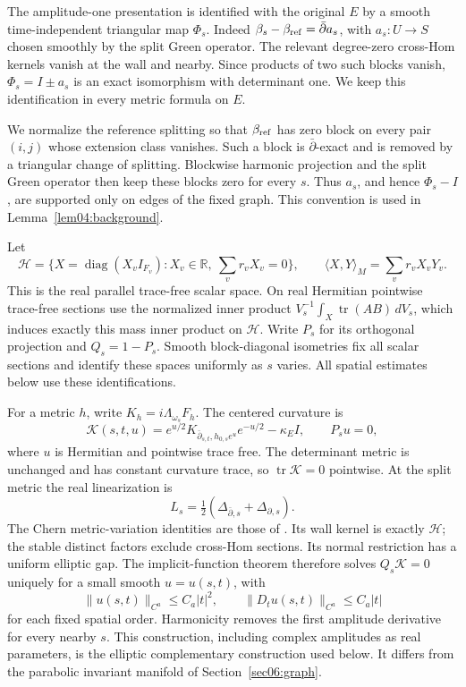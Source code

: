 \documentclass[11pt]{amsart}
\theoremstyle{definition}
\theoremstyle{remark}
\newcommand{\RR}{\mathbb R}
\newcommand{\HH}{\mathcal H}
\newcommand{\cK}{\mathcal K}
\newcommand{\db}{\bar\partial}
\newcommand{\tr}{\operatorname{tr}}
\newcommand{\diag}{\operatorname{diag}}
\begin{document}
The amplitude-one presentation is identified with the original
\(E\) by a smooth time-independent triangular map \(\Phi_s\).
Indeed \(\beta_s-\beta_{\rm ref}=\db a_s\), with \(a_s:U\to S\)
chosen smoothly by the split Green operator. The relevant degree-zero
cross-Hom kernels vanish at the wall and nearby. Since products of
two such blocks vanish, \(\Phi_s=I\pm a_s\) is an exact isomorphism
with determinant one. We keep this identification in every metric
formula on \(E\).

We normalize the reference splitting so that \(\beta_{\rm ref}\)
has zero block on every pair \((i,j)\) whose extension class vanishes.
Such a block is \(\db\)-exact and is removed by a triangular
change of splitting. Blockwise harmonic projection and the split
Green operator then keep these blocks zero for every \(s\).
Thus \(a_s\), and hence \(\Phi_s-I\), are supported only on
edges of the fixed graph. This convention is used in
Lemma~\ref{lem04:background}.

Let
\begin{equation}\label{eq02:scalarspace}
 \HH=\{X=\diag(X_vI_{F_v}):X_v\in\RR,\ \sum_vr_vX_v=0\},
 \qquad \langle X,Y\rangle_M=\sum_vr_vX_vY_v.
\end{equation}
This is the real parallel trace-free scalar space. On real Hermitian
pointwise trace-free sections use the normalized inner product
\(V_s^{-1}\int_X\tr(AB)\,dV_s\), which induces exactly this mass
inner product on \(\HH\). Write \(P_s\) for its orthogonal
projection and \(Q_s=1-P_s\). Smooth block-diagonal isometries fix
all scalar sections and identify these spaces uniformly as \(s\)
varies. All spatial estimates below use these identifications.

For a metric \(h\), write \(K_h=i\Lambda_{\omega_s}F_h\).
The centered curvature is
\[
 \cK(s,t,u)=e^{u/2}K_{\db_{s,t},h_{0,s}e^u}e^{-u/2}-\kappa_EI,
 \qquad P_su=0,
\]
where \(u\) is Hermitian and pointwise trace free. The determinant
metric is unchanged and has constant curvature trace, so
\(\tr\cK=0\) pointwise. At the split metric the real linearization is
\begin{equation}\label{eq02:realoperator}
 L_s=\tfrac12(\Delta_{\db,s}+\Delta_{\partial,s}).
\end{equation}
The Chern metric-variation identities are those of
\cite[\S4.2, equations~(4.2.12)--(4.2.16)]{kobayashi1987}.
Its wall kernel is exactly \(\HH\); the stable distinct factors
exclude cross-Hom sections. Its normal restriction has a uniform
elliptic gap. The implicit-function theorem therefore solves
\(Q_s\cK=0\) uniquely for a small smooth \(u=u(s,t)\), with
\begin{equation}\label{eq02:complement}
 \|u(s,t)\|_{C^a}\le C_a|t|^2,\qquad
 \|D_tu(s,t)\|_{C^a}\le C_a|t|
\end{equation}
for each fixed spatial order. Harmonicity removes the first amplitude
derivative for every nearby \(s\). This construction, including
complex amplitudes as real parameters, is the elliptic complementary
construction used below. It differs from the parabolic invariant
manifold of Section~\ref{sec06:graph}.
\end{document}
